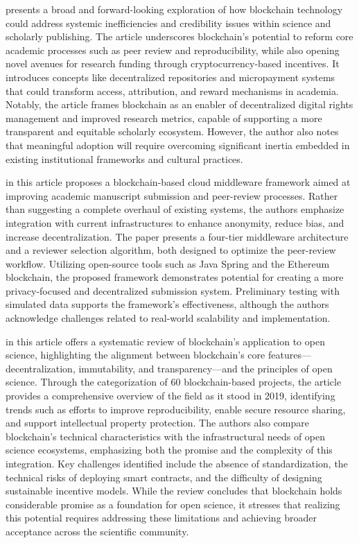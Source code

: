 \cite{van_rossum_blockchain_2018} presents a broad and forward-looking exploration of how blockchain technology could address systemic inefficiencies and credibility issues within science and scholarly publishing. The article underscores blockchain’s potential to reform core academic processes such as peer review and reproducibility, while also opening novel avenues for research funding through cryptocurrency-based incentives. It introduces concepts like decentralized repositories and micropayment systems that could transform access, attribution, and reward mechanisms in academia. Notably, the article frames blockchain as an enabler of decentralized digital rights management and improved research metrics, capable of supporting a more transparent and equitable scholarly ecosystem. However, the author also notes that meaningful adoption will require overcoming significant inertia embedded in existing institutional frameworks and cultural practices.

\cite{gazis_blockchain_2022} in this article proposes a blockchain-based cloud middleware framework aimed at improving academic manuscript submission and peer-review processes. Rather than suggesting a complete overhaul of existing systems, the authors emphasize integration with current infrastructures to enhance anonymity, reduce bias, and increase decentralization. The paper presents a four-tier middleware architecture and a reviewer selection algorithm, both designed to optimize the peer-review workflow. Utilizing open-source tools such as Java Spring and the Ethereum blockchain, the proposed framework demonstrates potential for creating a more privacy-focused and decentralized submission system. Preliminary testing with simulated data supports the framework’s effectiveness, although the authors acknowledge challenges related to real-world scalability and implementation.

\cite{leible_review_2019} in this article offers a systematic review of blockchain’s application to open science, highlighting the alignment between blockchain’s core features—decentralization, immutability, and transparency—and the principles of open science. Through the categorization of 60 blockchain-based projects, the article provides a comprehensive overview of the field as it stood in 2019, identifying trends such as efforts to improve reproducibility, enable secure resource sharing, and support intellectual property protection. The authors also compare blockchain’s technical characteristics with the infrastructural needs of open science ecosystems, emphasizing both the promise and the complexity of this integration. Key challenges identified include the absence of standardization, the technical risks of deploying smart contracts, and the difficulty of designing sustainable incentive models. While the review concludes that blockchain holds considerable promise as a foundation for open science, it stresses that realizing this potential requires addressing these limitations and achieving broader acceptance across the scientific community.

